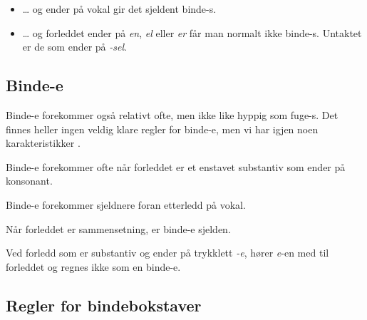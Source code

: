\begin{items}
\begin{itemize}
		\newline
		
		\item … og ender på vokal gir det sjeldent binde-s.
		
		
		\item … og forleddet ender på \textit{en}, \textit{el} eller \textit{er} får man normalt ikke binde-s. Untaktet er de som ender på \textit{-sel}.
		
		\newline
		
	\end{itemize}
\end{items}

\subsection{Binde-e}
\label{sec:ord-bind2}

Binde-e forekommer også relativt ofte, men ikke like hyppig som fuge-s. Det finnes heller ingen veldig klare regler for binde-e, men vi har igjen noen karakteristikker \cite{faarlund1997norsk}.

\begin{items}
	\item Binde-e forekommer ofte når forleddet er et enstavet substantiv som ender på konsonant. 
		
		
	\item Binde-e forekommer sjeldnere foran etterledd på vokal.

	 
	\item Når forleddet er sammensetning, er binde-e sjelden. 
	 

	\item Ved forledd som er substantiv og ender på trykklett \textit{-e}, hører \textit{e}-en med til forleddet og regnes ikke som en binde-e. 

\end{items}


\subsection{Regler for bindebokstaver}
\label{sec:reg-bind}

